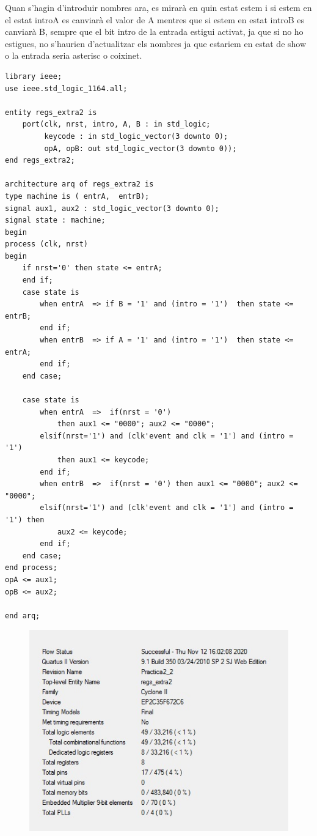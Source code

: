\documentclass[12pt, a4papre]{article}
\begin{document}
	Quan s'hagin d'introduir nombres ara, es mirarà en quin estat estem i si estem en el estat introA es canviarà el valor de A mentres que si estem en estat introB es canviarà B, sempre que el bit intro de la entrada estigui activat, ja que si no ho estigues, no s'haurien d'actualitzar els nombres ja que estariem en estat de show o la entrada seria asterisc o coixinet.
	
		\begin{lstlisting}[style=vhdl, frame=single, basicstyle=\tiny]
library ieee;
use ieee.std_logic_1164.all;

entity regs_extra2 is
	port(clk, nrst, intro, A, B : in std_logic;
		 keycode : in std_logic_vector(3 downto 0);
		 opA, opB: out std_logic_vector(3 downto 0));
end regs_extra2;

architecture arq of regs_extra2 is
type machine is ( entrA,  entrB);
signal aux1, aux2 : std_logic_vector(3 downto 0);
signal state : machine;
begin
process (clk, nrst)
begin 
	if nrst='0' then state <= entrA;
	end if;
	case state is
	    when entrA  => if B = '1' and (intro = '1')  then state <= entrB; 
	    end if;
	    when entrB  => if A = '1' and (intro = '1')  then state <= entrA; 
	    end if;
	end case;
	
	case state is
	    when entrA  =>  if(nrst = '0') 
			then aux1 <= "0000"; aux2 <= "0000";
		elsif(nrst='1') and (clk'event and clk = '1') and (intro = '1') 
			then aux1 <= keycode;
		end if;
	    when entrB  =>  if(nrst = '0') then aux1 <= "0000"; aux2 <= "0000";
		elsif(nrst='1') and (clk'event and clk = '1') and (intro = '1') then
			aux2 <= keycode;
		end if;
	end case;
end process;
opA <= aux1;
opB <= aux2;

end arq;
\end{lstlisting}

\begin{figure}[H]
		\begin{center}
		\includegraphics[width=130mm]{informeRegsextra.jpeg}
		\end{center}
	\end{figure}
	
\end{document}
